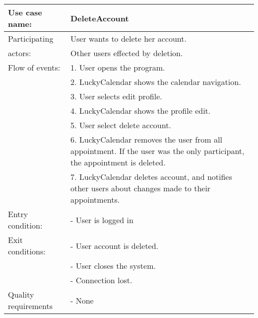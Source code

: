 {\tabulinesep=1.2mm
\begin{tabu}{ | p{3cm} | p{13cm} |}
    \hline
    Use case name: 			& 		DeleteAccount\\ \hline
    Participating  			& 		User wants to delete her account. \\
    actors:					&		Other users effected by deletion.\\ \hline
    Flow of events: 		& 		1. User opens the program. \\
							&		2. LuckyCalendar shows the calendar navigation.\\
							&		3. User selects edit profile.\\
							&		4. LuckyCalendar shows the profile edit.\\
							&		5. User select delete account.\\
							&		6. LuckyCalendar removes the user from all appointment. If the user was the only participant, the appointment is deleted.\\
							&		7. LuckyCalendar deletes account, and notifies other users about changes made to their appointments. \\\hline
    Entry condition: 		& 		- User is logged in  \\ \hline
	Exit conditions: 		&		- User account is deleted.\\
							&		- User closes the system.\\
							&		- Connection lost.\\\hline
	Quality requirements	&	 	- None \\\hline
\end{tabu}
}